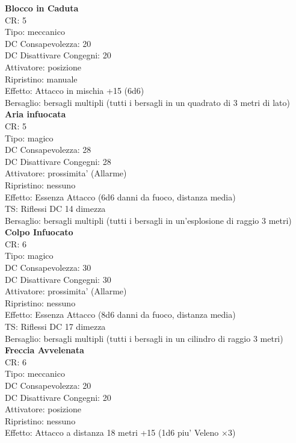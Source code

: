 \documentclass[a4paper,11pt,twoside,openany]{book}
\begin{document}
{\begin{multicols}{2}
\textbf{Blocco in Caduta}\\
CR: 5 \\
Tipo: meccanico \\
DC Consapevolezza: 20 \\
DC Disattivare Congegni: 20 \\
Attivatore: posizione \\
Ripristino: manuale \\
Effetto: Attacco in mischia +15 (6d6) \\
Bersaglio: bersagli multipli (tutti i bersagli in un quadrato di 3 metri di lato)\\

\textbf{Aria infuocata}\\
CR: 5 \\
Tipo: magico \\
DC Consapevolezza: 28 \\
DC Disattivare Congegni: 28 \\
Attivatore: prossimita' (Allarme) \\
Ripristino: nessuno \\
Effetto: Essenza Attacco (6d6 danni da fuoco, distanza media)\\
TS: Riflessi DC 14 dimezza \\
Bersaglio: bersagli multipli (tutti i bersagli in un’esplosione di raggio 3 metri)\\

\textbf{Colpo Infuocato}\\
CR: 6 \\
Tipo: magico \\
DC Consapevolezza: 30 \\
DC Disattivare Congegni: 30 \\
Attivatore: prossimita' (Allarme) \\
Ripristino: nessuno \\
Effetto: Essenza Attacco (8d6 danni da fuoco, distanza media)\\
TS: Riflessi DC 17 dimezza \\
Bersaglio: bersagli multipli (tutti i bersagli in un cilindro di raggio 3 metri)\\

\textbf{Freccia Avvelenata}\\
CR: 6 \\
Tipo: meccanico \\
DC Consapevolezza: 20 \\
DC Disattivare Congegni: 20 \\
Attivatore: posizione \\
Ripristino: nessuno \\
Effetto: Attacco a distanza 18 metri +15 (1d6 piu' Veleno ×3)\\


\end{multicols}}
\end{document}
